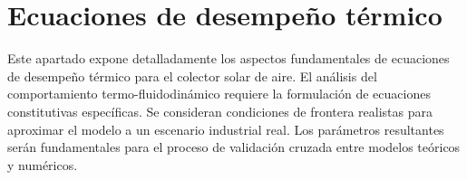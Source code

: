 \section{Ecuaciones de desempeño térmico}
\label{sec:cap06_desempeno}

Este apartado expone detalladamente los aspectos fundamentales de ecuaciones de desempeño térmico para el colector solar de aire.
El análisis del comportamiento termo-fluidodinámico requiere la formulación de ecuaciones constitutivas específicas.
Se consideran condiciones de frontera realistas para aproximar el modelo a un escenario industrial real.
Los parámetros resultantes serán fundamentales para el proceso de validación cruzada entre modelos teóricos y numéricos.
